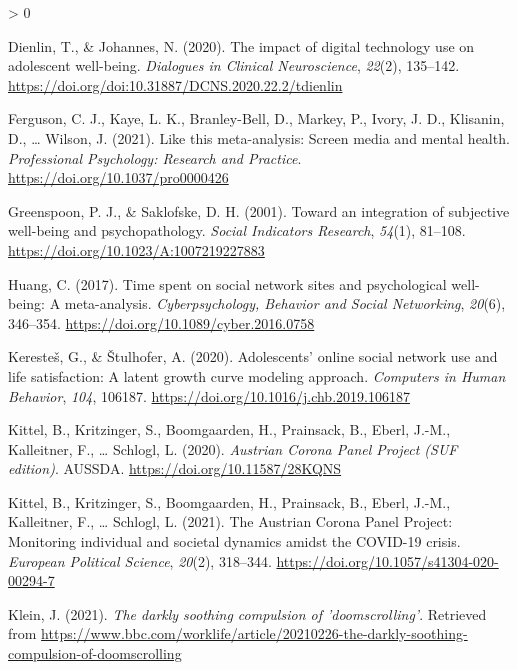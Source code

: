 \documentclass[
  english,
  man,mask,floatsintext]{apa6}
\newlength{\cslhangindent}
\newenvironment{CSLReferences}[2] %
 {%
  \setlength{\parindent}{0pt}
  \ifodd #1 \everypar{\setlength{\hangindent}{\cslhangindent}}\ignorespaces\fi
  \ifnum #2 > 0
  \setlength{\parskip}{#2\baselineskip}
  \fi
 }%
 {}
\begin{document}
\begin{CSLReferences}{1}{0}
\leavevmode\hypertarget{ref-dienlinImpactDigitalTechnology2020}{}%
Dienlin, T., \& Johannes, N. (2020). The impact of digital technology use on adolescent well-being. \emph{Dialogues in Clinical Neuroscience}, \emph{22}(2), 135--142. \url{https://doi.org/doi:10.31887/DCNS.2020.22.2/tdienlin}

\leavevmode\hypertarget{ref-fergusonThisMetaanalysisScreen2021}{}%
Ferguson, C. J., Kaye, L. K., Branley-Bell, D., Markey, P., Ivory, J. D., Klisanin, D., \ldots{} Wilson, J. (2021). Like this meta-analysis: {Screen} media and mental health. \emph{Professional Psychology: Research and Practice}. \url{https://doi.org/10.1037/pro0000426}

\leavevmode\hypertarget{ref-greenspoonIntegrationSubjectiveWellbeing2001}{}%
Greenspoon, P. J., \& Saklofske, D. H. (2001). Toward an integration of subjective well-being and psychopathology. \emph{Social Indicators Research}, \emph{54}(1), 81--108. \url{https://doi.org/10.1023/A:1007219227883}

\leavevmode\hypertarget{ref-huangTimeSpentSocial2017}{}%
Huang, C. (2017). Time spent on social network sites and psychological well-being: {A} meta-analysis. \emph{Cyberpsychology, Behavior and Social Networking}, \emph{20}(6), 346--354. \url{https://doi.org/10.1089/cyber.2016.0758}

\leavevmode\hypertarget{ref-kerestesAdolescentsOnlineSocial2020}{}%
Keresteš, G., \& Štulhofer, A. (2020). Adolescents' online social network use and life satisfaction: {A} latent growth curve modeling approach. \emph{Computers in Human Behavior}, \emph{104}, 106187. \url{https://doi.org/10.1016/j.chb.2019.106187}

\leavevmode\hypertarget{ref-kittelAustrianCoronaPanel2020}{}%
Kittel, B., Kritzinger, S., Boomgaarden, H., Prainsack, B., Eberl, J.-M., Kalleitner, F., \ldots{} Schlogl, L. (2020). \emph{Austrian {Corona} {Panel} {Project} ({SUF} edition)}. AUSSDA. \url{https://doi.org/10.11587/28KQNS}

\leavevmode\hypertarget{ref-kittelAustrianCoronaPanel2021}{}%
Kittel, B., Kritzinger, S., Boomgaarden, H., Prainsack, B., Eberl, J.-M., Kalleitner, F., \ldots{} Schlogl, L. (2021). The {Austrian} {Corona} {Panel} {Project}: Monitoring individual and societal dynamics amidst the {COVID}-19 crisis. \emph{European Political Science}, \emph{20}(2), 318--344. \url{https://doi.org/10.1057/s41304-020-00294-7}

\leavevmode\hypertarget{ref-kleinDarklySoothingCompulsion2021}{}%
Klein, J. (2021). \emph{The darkly soothing compulsion of 'doomscrolling'}. Retrieved from \url{https://www.bbc.com/worklife/article/20210226-the-darkly-soothing-compulsion-of-doomscrolling}


\end{CSLReferences}
\end{document}
